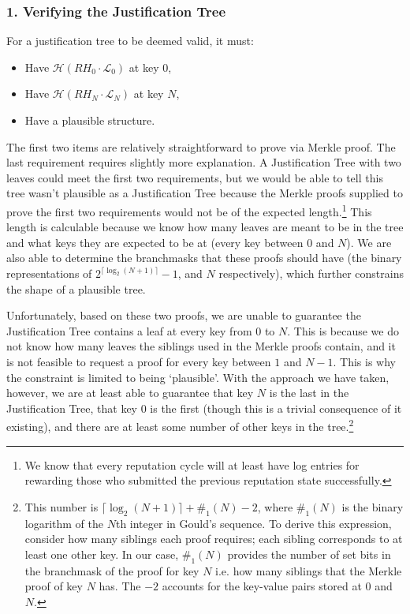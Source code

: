 \subsubsection*{1. Verifying the Justification Tree}

For a justification tree to be deemed valid, it must:

\begin{itemize}
\item Have $\mathcal{H}(RH_0 \cdot \mathcal{L}_0)$ at key 0,
\item Have $\mathcal{H}(RH_N \cdot \mathcal{L}_N)$ at key $N$,
\item Have a plausible structure.
\end{itemize}

The first two items are relatively straightforward to prove via Merkle proof. The last requirement requires slightly more explanation. A Justification Tree with two leaves could meet the first two requirements, but we would be able to tell this tree wasn't plausible as a Justification Tree because the Merkle proofs supplied to prove the first two requirements would not be of the expected length.\footnote{We know that every reputation cycle will at least have log entries for rewarding those who submitted the previous reputation state successfully.} This length is calculable because we know how many leaves are meant to be in the tree and what keys they are expected to be at (every key between 0 and $N$). We are also able to determine the branchmasks that these proofs should have (the binary representations of $2^{\lceil\log_2 (N+1) \rceil} - 1$, and $N$ respectively), which further constrains the shape of a plausible tree.

Unfortunately, based on these two proofs, we are unable to guarantee the Justification Tree contains a leaf at every key from 0 to $N$. This is because we do not know how many leaves the siblings used in the Merkle proofs contain, and it is not feasible to request a proof for every key between $1$ and $N-1$. This is why the constraint is limited to being `plausible'. With the approach we have taken, however, we are at least able to guarantee that key $N$ is the last in the Justification Tree, that key $0$ is the first (though this is a trivial consequence of it existing), and there are at least some number of other keys in the tree.\footnote{This number is $\lceil\log_2 (N+1) \rceil + \#_{1}(N) - 2$, where $\#_{1}(N)$ is the binary logarithm of the $N$th integer in Gould's sequence. To derive this expression, consider how many siblings each proof requires; each sibling corresponds to at least one other key. In our case, $\#_{1}(N)$ provides the number of set bits in the branchmask of the proof for key $N$ i.e. how many siblings that the Merkle proof of key $N$ has. The $-2$ accounts for the key-value pairs stored at 0 and $N$.}

